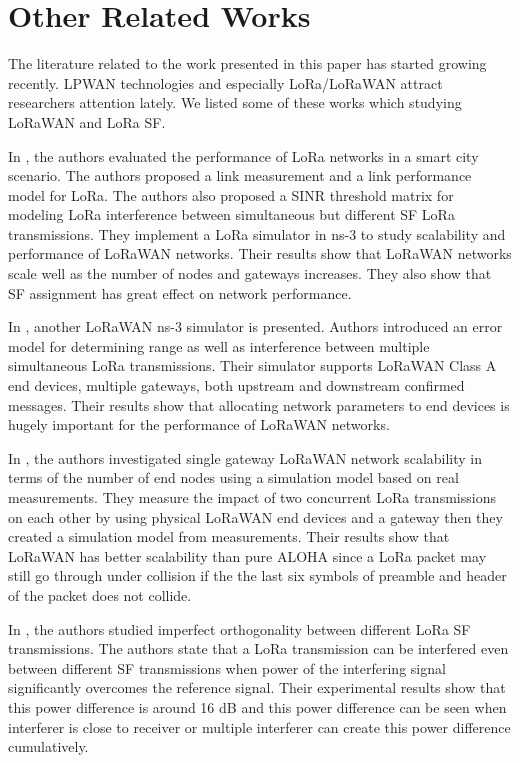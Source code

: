\documentclass[conference]{IEEEtran}
\begin{document}
\section{Other Related Works} \label{Other Related Works}
The literature related to the work presented in this paper has started growing recently. LPWAN technologies and especially LoRa/LoRaWAN attract researchers attention lately. We listed some of these works which studying LoRaWAN and LoRa SF.

\par In \cite{7996384}, the authors evaluated the performance of LoRa networks in a smart city scenario. The
authors proposed a link measurement and a link performance model for LoRa. The authors also proposed a SINR threshold matrix for modeling LoRa interference between simultaneous but different SF LoRa transmissions. They implement a LoRa simulator in ns-3 to study scalability and performance of LoRaWAN networks. Their results show that LoRaWAN networks scale well as the number of nodes and gateways increases. They also show that SF assignment has great effect on network performance.

\par In \cite{8090518}, another LoRaWAN ns-3 simulator is presented. Authors introduced an error model for determining range as well as interference between multiple simultaneous LoRa transmissions. Their simulator supports LoRaWAN Class A end devices, multiple gateways, both upstream and downstream confirmed messages. Their results show that allocating network parameters to end devices is hugely important for the performance of LoRaWAN networks.

\par In \cite{s17061193}, the authors investigated single gateway LoRaWAN network scalability in terms of the number of end nodes using a simulation model based on real measurements. They measure the impact of two concurrent LoRa transmissions on each other by using physical LoRaWAN end devices and a gateway then they created a simulation model from measurements. Their results show that LoRaWAN has better scalability than pure ALOHA since a LoRa packet may still go through under collision if the the last six symbols of preamble and header of the packet does not collide.

\par In \cite{8267219}, the authors studied imperfect orthogonality between different LoRa SF transmissions. The authors state that a LoRa transmission can be interfered even between different SF transmissions when power of the interfering signal significantly overcomes the reference signal. Their experimental results show that this power difference is around 16 dB and this power difference can be seen when  interferer is close to receiver or multiple interferer can create this power difference cumulatively. 
\end{document}

